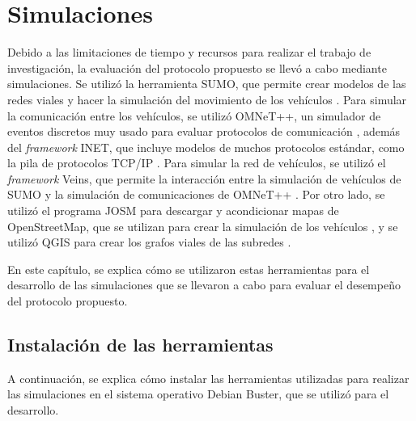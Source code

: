 ﻿%

\chapter{Simulaciones}

\label{ch:simulaciones}

Debido a las limitaciones de tiempo y recursos para realizar el trabajo de
investigación, la evaluación del protocolo propuesto se llevó a cabo mediante
simulaciones. Se utilizó la herramienta SUMO, que permite crear modelos de las
redes viales y hacer la simulación del movimiento de los vehículos \cite{SUMO}.
Para simular la comunicación entre los vehículos, se utilizó OMNeT++, un
simulador de eventos discretos muy usado para evaluar protocolos de
comunicación \cite{OMNeT}, además del \textit{framework} INET, que incluye
modelos de muchos protocolos estándar, como la pila de protocolos TCP/IP
\cite{INET}. Para simular la red de vehículos, se utilizó el \textit{framework}
Veins, que permite la interacción entre la simulación de vehículos de SUMO y la
simulación de comunicaciones de OMNeT++ \cite{Veins}. Por otro lado, se utilizó
el programa JOSM para descargar y acondicionar mapas de OpenStreetMap, que se
utilizan para crear la simulación de los vehículos \cite{OpenStreetMap}
\cite{JOSM}, y se utilizó QGIS para crear los grafos viales de las subredes
\cite{QGIS}.

En este capítulo, se explica cómo se utilizaron estas herramientas para el
desarrollo de las simulaciones que se llevaron a cabo para evaluar el desempeño
del protocolo propuesto.


\section{Instalación de las herramientas}

\label{sec:instalacion_herramientas}

A continuación, se explica cómo instalar las herramientas utilizadas para
realizar las simulaciones en el sistema operativo Debian Buster, que se utilizó
para el desarrollo.

